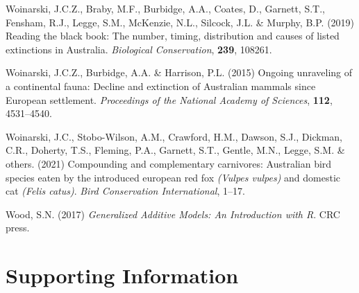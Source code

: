 \documentclass[]{elsarticle} %
\begin{document}
\leavevmode\hypertarget{ref-woinarski2019reading}{}%
Woinarski, J.C.Z., Braby, M.F., Burbidge, A.A., Coates, D., Garnett, S.T., Fensham, R.J., Legge, S.M., McKenzie, N.L., Silcock, J.L. \& Murphy, B.P. (2019) Reading the black book: The number, timing, distribution and causes of listed extinctions in Australia. \emph{Biological Conservation}, \textbf{239}, 108261.

\leavevmode\hypertarget{ref-woinarski2015ongoing}{}%
Woinarski, J.C.Z., Burbidge, A.A. \& Harrison, P.L. (2015) Ongoing unraveling of a continental fauna: Decline and extinction of Australian mammals since European settlement. \emph{Proceedings of the National Academy of Sciences}, \textbf{112}, 4531--4540.

\leavevmode\hypertarget{ref-woinarski2021compounding}{}%
Woinarski, J.C., Stobo-Wilson, A.M., Crawford, H.M., Dawson, S.J., Dickman, C.R., Doherty, T.S., Fleming, P.A., Garnett, S.T., Gentle, M.N., Legge, S.M. \& others. (2021) Compounding and complementary carnivores: Australian bird species eaten by the introduced european red fox \emph{(Vulpes vulpes)} and domestic cat \emph{(Felis catus)}. \emph{Bird Conservation International}, 1--17.

\leavevmode\hypertarget{ref-wood2017generalized}{}%
Wood, S.N. (2017) \emph{Generalized Additive Models: An Introduction with R}. CRC press.

\newpage

\setcounter{table}{0}  \renewcommand{\thetable}{S\arabic{table}} \setcounter{figure}{0} \renewcommand{\thefigure}{S\arabic{figure}} \setcounter{section}{0} \renewcommand{\thesection}{S\arabic{section}}

\hypertarget{supporting-information}{%
\section*{Supporting Information}\label{supporting-information}}

\newpage

\(~\)

\(~\)

\(~\)

\begingroup\fontsize{10}{12}\selectfont
\end{document}
